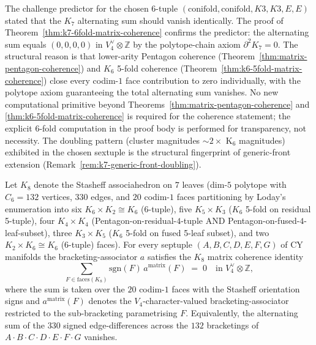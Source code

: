\begin{remark}
\label{rem:k7-predictor-confirmed}
The challenge predictor for the chosen 6-tuple
$(\mathrm{conifold}, \mathrm{conifold}, K3, K3, E, E)$ stated that the
$K_7$ alternating sum should vanish identically. The proof of
Theorem~\ref{thm:k7-6fold-matrix-coherence} confirms the predictor:
the alternating sum equals $(0, 0, 0, 0)$ in $V_4^\vee \otimes \mathbb{Z}$
by the polytope-chain axiom $\partial^2 K_7 = 0$. The structural reason
is that lower-arity Pentagon coherence
\textup{(}Theorem~\ref{thm:matrix-pentagon-coherence}\textup{)} and
$K_6$ 5-fold coherence
\textup{(}Theorem~\ref{thm:k6-5fold-matrix-coherence}\textup{)} close
every codim-$1$ face contribution to zero individually, with the
polytope axiom guaranteeing the total alternating sum vanishes. No
new computational primitive beyond Theorems~\ref{thm:matrix-pentagon-coherence}
and \ref{thm:k6-5fold-matrix-coherence} is required for the coherence
statement; the explicit $6$-fold computation in the proof body is
performed for transparency, not necessity. The doubling pattern
\textup{(}cluster magnitudes $\sim 2 \times$ K$_6$ magnitudes\textup{)}
exhibited in the chosen sextuple is the structural fingerprint of
generic-front extension
\textup{(}Remark~\ref{rem:k7-generic-front-doubling}\textup{).}
\end{remark}

\begin{theorem}
\label{thm:k8-7fold-matrix-coherence}
Let $K_8$ denote the Stasheff associahedron on $7$ leaves
\textup{(}dim-$5$ polytope with $C_6 = 132$ vertices, $330$ edges, and
$20$ codim-$1$ faces partitioning by Loday's enumeration into six
$K_6 \times K_2 \cong K_6$ \textup{(}6-tuple\textup{),} five
$K_5 \times K_3$ \textup{(}$K_6$ 5-fold on residual 5-tuple\textup{),} four
$K_4 \times K_4$ \textup{(}Pentagon-on-residual-$4$-tuple AND
Pentagon-on-fused-$4$-leaf-subset\textup{),} three $K_3 \times K_5$
\textup{(}$K_6$ 5-fold on fused 5-leaf subset\textup{),} and two
$K_2 \times K_6 \cong K_6$ \textup{(}6-tuple\textup{)} faces\textup{).}
For every septuple $(A, B, C, D, E, F, G)$ of CY manifolds the
bracketing-associator $a$ satisfies the $K_8$ matrix coherence identity
\[
 \boxed{\;
 \sum_{F \in \mathrm{faces}(K_8)} \mathrm{sgn}(F)\,
 a^{\mathrm{matrix}}(F)
 \;=\; 0 \quad \text{in } V_4^\vee \otimes \mathbb{Z},
 \;}
\]
where the sum is taken over the $20$ codim-$1$ faces with the Stasheff
orientation signs and $a^{\mathrm{matrix}}(F)$ denotes the
$V_4$-character-valued bracketing-associator restricted to the
sub-bracketing parametrising $F$. Equivalently, the alternating sum of
the $330$ signed edge-differences across the $132$ bracketings of
$A \cdot B \cdot C \cdot D \cdot E \cdot F \cdot G$ vanishes.
\end{theorem}

